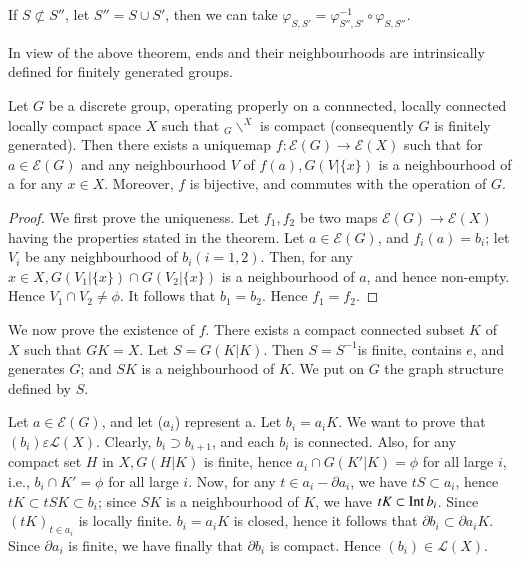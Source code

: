 If $ S \not\subset S'' $, let $S'' = S \cup S'$, then we can take
$\varphi_{S, S'} = \varphi^{-1}_{S'', S'} \circ \varphi_{S, S''}$.  

In view of the above theorem, ends and their neighbourhoods are
intrinsically defined for finitely generated groups.  

\begin{thm}\label{chap5:thm3} %
  Let $G$ be a discrete group, operating properly on a connn\-ected,
  locally connected locally compact space $X$ such that $_G\backslash^X$
  is compact (consequently $G$ is finitely generated). Then there exists
  a unique\pageoriginale map $f : \mathscr{E}(G) \to \mathscr{E}(X)$ such that for
  $a \in \mathscr{E}(G)$ and any neighbourhood $V$ of $f(a), G(V|\{ x\}
  )$ is a neighbourhood of a for any $x \in X$. Moreover, $f$ is
  bijective, and commutes with the operation of $G$.  
\end{thm}

\begin{proof}
  We first prove the uniqueness. Let $f_1, f_2$ be two maps $\mathscr{E}
  (G)\to \mathscr{E}(X)$ having the properties stated in the
  theorem. Let $a \in \mathscr{E}(G)$, and $f_i(a) = b_i$; let $V_i$ be
  any neighbourhood of $b_i (i = 1, 2)$. Then, for any $x \in X, G (V_1
  |\{ x\}) \cap G(V_2| \{ x\})$ is a neighbourhood of $a$, and hence
  non-empty. Hence $V_1 
  \cap V_2 \neq \phi $. It follows that $b_1 = b_2$. Hence $f_1 = f_2$.  
\end{proof}

We now prove the existence of $f$. There exists a compact connected
subset $K$ of $X$ such that $ GK = X $. Let $S = G(K|K)$. Then $S =
S^{-1}$is finite, contains $e$, and generates $G$; and $SK$ is a
neighbourhood of $K$. We put on $G$ the graph structure defined by
$S$. 

Let $a \in \mathscr{E}(G)$, and let ($a_i$) represent a. Let $b_i =
a_i K$. We want  to prove that $(b_i )\varepsilon
\mathscr{L}(X)$. Clearly, $b_i \supset b_{i +1}$, and each $b_i$ is
connected. Also, for any compact set $H$ in $X, G(H|K)$ is finite,
hence $a_i \cap G(K' | K) = \phi $ for all large
$i$, i.e., $b_i \cap K' = \phi$ for all large $i$. Now, for any $t \in
a_i -  \partial a_i $, we have $ tS \subset a_i$, hence $tK \subset
tSK \subset b_i$; since $SK$ is a neighbourhood of $K$, we have $tK
\subset \operatorname{Int} b_i$. Since $(tK)_{t \in a_i}$ is locally finite. $b_i
= a_i K $ is closed, hence it follows that $ \partial b_i \subset
\partial a_i K$. Since $\partial a_i$ is finite, we have finally that
 $\partial b_i$ is compact. Hence $(b_i) \in \mathscr{L}(X)$.  

